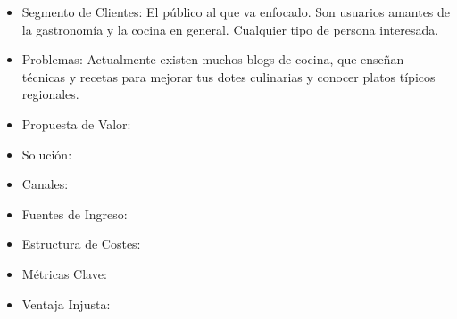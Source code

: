 \begin{itemize}
  \item Segmento de Clientes: El público al que va enfocado. Son usuarios amantes de la gastronomía y la cocina en general. Cualquier tipo de persona interesada.
  \item Problemas: Actualmente existen muchos blogs de cocina, que enseñan técnicas y recetas para mejorar tus dotes culinarias y conocer platos típicos regionales.
  \item Propuesta de Valor:
  \item Solución:
  \item Canales:
  \item Fuentes de Ingreso:
  \item Estructura de Costes:
  \item Métricas Clave:
  \item Ventaja Injusta:
\end{itemize}
